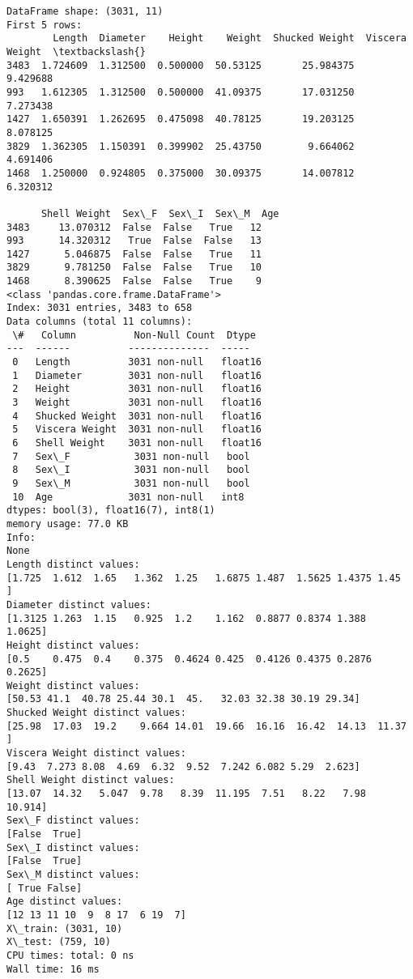 \documentclass[11pt]{article}
\begin{document}
    \begin{Verbatim}[commandchars=\\\{\}]
DataFrame shape: (3031, 11)
First 5 rows:
        Length  Diameter    Height    Weight  Shucked Weight  Viscera Weight  \textbackslash{}
3483  1.724609  1.312500  0.500000  50.53125       25.984375        9.429688
993   1.612305  1.312500  0.500000  41.09375       17.031250        7.273438
1427  1.650391  1.262695  0.475098  40.78125       19.203125        8.078125
3829  1.362305  1.150391  0.399902  25.43750        9.664062        4.691406
1468  1.250000  0.924805  0.375000  30.09375       14.007812        6.320312

      Shell Weight  Sex\_F  Sex\_I  Sex\_M  Age
3483     13.070312  False  False   True   12
993      14.320312   True  False  False   13
1427      5.046875  False  False   True   11
3829      9.781250  False  False   True   10
1468      8.390625  False  False   True    9
<class 'pandas.core.frame.DataFrame'>
Index: 3031 entries, 3483 to 658
Data columns (total 11 columns):
 \#   Column          Non-Null Count  Dtype
---  ------          --------------  -----
 0   Length          3031 non-null   float16
 1   Diameter        3031 non-null   float16
 2   Height          3031 non-null   float16
 3   Weight          3031 non-null   float16
 4   Shucked Weight  3031 non-null   float16
 5   Viscera Weight  3031 non-null   float16
 6   Shell Weight    3031 non-null   float16
 7   Sex\_F           3031 non-null   bool
 8   Sex\_I           3031 non-null   bool
 9   Sex\_M           3031 non-null   bool
 10  Age             3031 non-null   int8
dtypes: bool(3), float16(7), int8(1)
memory usage: 77.0 KB
Info:
None
Length distinct values:
[1.725  1.612  1.65   1.362  1.25   1.6875 1.487  1.5625 1.4375 1.45  ]
Diameter distinct values:
[1.3125 1.263  1.15   0.925  1.2    1.162  0.8877 0.8374 1.388  1.0625]
Height distinct values:
[0.5    0.475  0.4    0.375  0.4624 0.425  0.4126 0.4375 0.2876 0.2625]
Weight distinct values:
[50.53 41.1  40.78 25.44 30.1  45.   32.03 32.38 30.19 29.34]
Shucked Weight distinct values:
[25.98  17.03  19.2    9.664 14.01  19.66  16.16  16.42  14.13  11.37 ]
Viscera Weight distinct values:
[9.43  7.273 8.08  4.69  6.32  9.52  7.242 6.082 5.29  2.623]
Shell Weight distinct values:
[13.07  14.32   5.047  9.78   8.39  11.195  7.51   8.22   7.98  10.914]
Sex\_F distinct values:
[False  True]
Sex\_I distinct values:
[False  True]
Sex\_M distinct values:
[ True False]
Age distinct values:
[12 13 11 10  9  8 17  6 19  7]
X\_train: (3031, 10)
X\_test: (759, 10)
CPU times: total: 0 ns
Wall time: 16 ms
    \end{Verbatim}
\end{document}
